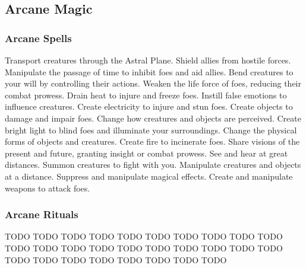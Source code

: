 
\small
\subsection{Arcane Magic}\label{Arcane Magic}
\subsubsection{Arcane Spells}\label{Arcane Spells}
\begin{spelllist}
 Transport creatures through the Astral Plane.
 Shield allies from hostile forces.
 Manipulate the passage of time to inhibit foes and aid allies.
 Bend creatures to your will by controlling their actions.
 Weaken the life force of foes, reducing their combat prowess.
 Drain heat to injure and freeze foes.
 Instill false emotions to influence creatures.
 Create electricity to injure and stun foes.
 Create objects to damage and impair foes.
 Change how creatures and objects are perceived.
 Create bright light to blind foes and illuminate your surroundings.
 Change the physical forms of objects and creatures.
 Create fire to incinerate foes.
 Share visions of the present and future, granting insight or combat prowess.
 See and hear at great distances.
 Summon creatures to fight with you.
 Manipulate creatures and objects at a distance.
 Suppress and manipulate magical effects.
 Create and manipulate weapons to attack foes.
\end{spelllist}
\subsubsection{Arcane Rituals}\label{Arcane Rituals}
\begin{spelllist}
 TODO
 TODO
 TODO
 TODO
 TODO
 TODO
 TODO
 TODO
 TODO
 TODO
 TODO
 TODO
 TODO
 TODO
 TODO
 TODO
 TODO
 TODO
 TODO
 TODO
 TODO
 TODO
 TODO
 TODO
 TODO
 TODO
 TODO
 TODO
\end{spelllist}




